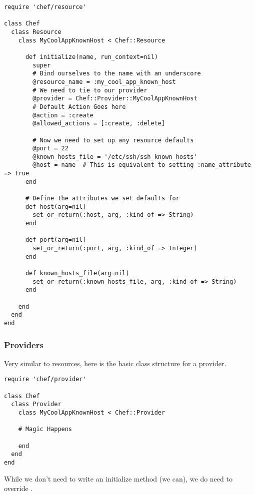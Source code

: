 \begin{lstlisting}[label=lst:cookbook-hwrp3]
require 'chef/resource'

class Chef
  class Resource
    class MyCoolAppKnownHost < Chef::Resource

      def initialize(name, run_context=nil)
        super
        # Bind ourselves to the name with an underscore
        @resource_name = :my_cool_app_known_host
        # We need to tie to our provider
        @provider = Chef::Provider::MyCoolAppKnownHost
        # Default Action Goes here
        @action = :create
        @allowed_actions = [:create, :delete]

        # Now we need to set up any resource defaults
        @port = 22
        @known_hosts_file = '/etc/ssh/ssh_known_hosts'
        @host = name  # This is equivalent to setting :name_attribute => true
      end

      # Define the attributes we set defaults for
      def host(arg=nil)
        set_or_return(:host, arg, :kind_of => String)
      end

      def port(arg=nil)
        set_or_return(:port, arg, :kind_of => Integer)
      end

      def known_hosts_file(arg=nil)
        set_or_return(:known_hosts_file, arg, :kind_of => String)
      end

    end
  end
end
\end{lstlisting}

\subsubsection{Providers}

Very similar to resources, here is the basic class structure for a provider.

\begin{lstlisting}[label=lst:cookbook-hwrp4]
require 'chef/provider'

class Chef
  class Provider
    class MyCoolAppKnownHost < Chef::Provider

    # Magic Happens

    end
  end
end
\end{lstlisting}

While we don’t need to write an initialize method (we can), we do need to override .

